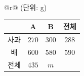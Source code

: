 {\renewcommand{\arraystretch}{1.3}\small
\begin{tabular}{@{}r@{}}
{\footnotesize (단위: g)} \\[1pt]
\begin{tabular}{|c|c|c|c|}
\hline
 & A & B & 전체 \\ \hline
사과 & $270$ & $300$ & $288$ \\ \hline
배 & $600$ & $580$ & $590$ \\ \hline
전체 & $435$ & $m$ & \\ \hline
\end{tabular}
\end{tabular}}
